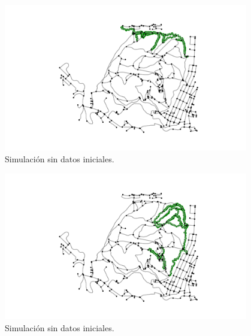 \begin{figure}[h]
\begin{center}
\includegraphics[width=0.95\textwidth]{./Imagenes/empty-simulation/track3.png}
\caption{Simulación sin datos iniciales.}
\end{center}
\label{figure:Simulation3}
\end{figure}

\begin{figure}[h]
\begin{center}
\includegraphics[width=0.95\textwidth]{./Imagenes/empty-simulation/track4.png}
\caption{Simulación sin datos iniciales.}
\end{center}
\label{figure:Simulation4}
\end{figure}